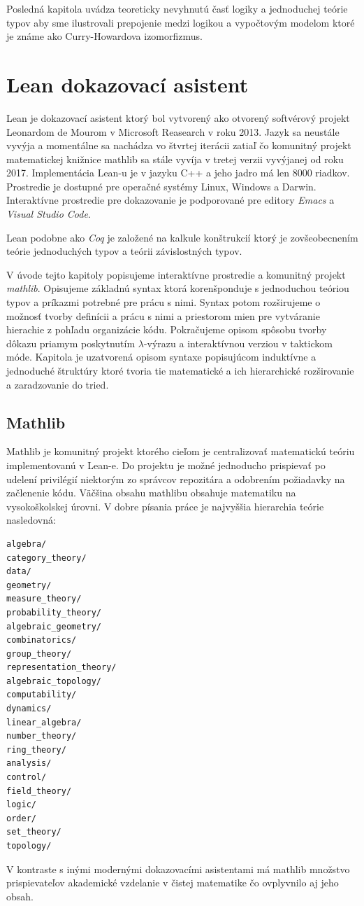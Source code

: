 \documentclass[a4paper,10pt,oneside]{report}%
\begin{document}
    Posledná kapitola uvádza teoreticky nevyhnutú časť logiky a jednoduchej
teórie typov aby sme ilustrovali prepojenie medzi logikou a vypočtovým modelom 
ktoré je známe ako Curry-Howardova izomorfizmus.

\chapter{Lean dokazovací asistent}
    Lean je dokazovací asistent ktorý bol vytvorený ako otvorený softvérový projekt
Leonardom de Mourom v Microsoft Reasearch v roku 2013.
    Jazyk sa neustále vyvýja a momentálne sa nachádza vo štvrtej iterácii \cite{lean4}
zatiaľ čo komunitný projekt matematickej knižnice mathlib sa stále vyvíja v tretej
    verzii \cite{lean3} vyvýjanej od roku 2017.
    Implementácia Lean-u je v jazyku C++ a jeho jadro má len 8000 riadkov.
    Prostredie je dostupné pre operačné systémy Linux, Windows a Darwin.
    Interaktívne prostredie pre dokazovanie je podporované pre editory \emph{Emacs} a \emph{Visual Studio Code}.

    Lean podobne ako \emph{Coq} je založené na kalkule konštrukcií ktorý je zovšeobecnením 
teórie jednoduchých typov a teórii závislostných typov.

    V úvode tejto kapitoly popisujeme interaktívne prostredie a komunitný projekt
\emph{mathlib}. Opisujeme základnú syntax ktorá korenšponduje s jednoduchou teóriou
typov a príkazmi potrebné pre prácu s nimi. Syntax potom rozširujeme o možnosť
tvorby definícii a prácu s nimi a priestorom mien pre vytváranie hierachie z pohľadu
organizácie kódu.
    Pokračujeme opisom spôsobu tvorby dôkazu priamym poskytnutím $\lambda$-výrazu
a interaktívnou verziou v taktickom móde.
    Kapitola je uzatvorená opisom syntaxe popisujúcom induktívne a jednoduché
štruktúry ktoré tvoria tie matematické a ich hierarchické rozširovanie a zaradzovanie
do tried.

\section{Mathlib}
    Mathlib je komunitný projekt \cite{mathlib} ktorého cieľom je centralizovať
matematickú teóriu implementovanú v Lean-e.
    Do projektu je možné jednoducho prispievať po udelení privilégií niektorým zo
správcov repozitára a odobrením požiadavky na začlenenie kódu.
    Väčšina obsahu mathlibu obsahuje matematiku na vysokoškolskej úrovni.
    V dobre písania práce je najvyššia hierarchia teórie nasledovná:
\begin{lstlisting}
algebra/
category_theory/
data/
geometry/
measure_theory/
probability_theory/
algebraic_geometry/
combinatorics/
group_theory/
representation_theory/
algebraic_topology/
computability/
dynamics/
linear_algebra/
number_theory/
ring_theory/
analysis/
control/
field_theory/
logic/
order/
set_theory/
topology/
\end{lstlisting}
    V kontraste s inými modernými dokazovacími asistentami má mathlib množstvo
prispievateľov akademické vzdelanie v čistej matematike \cite{mathlib_paper} čo
ovplyvnilo aj jeho obsah.
\end{document}

